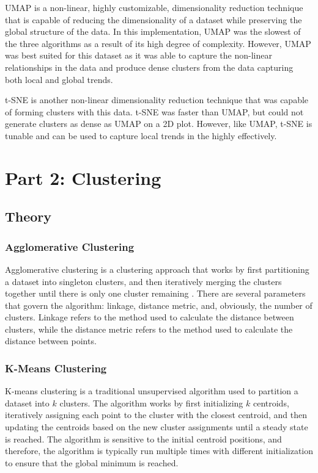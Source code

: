 \documentclass[12pt]{article}
\begin{document}
\begin{enumerate}
    UMAP is a non-linear, highly customizable, dimensionality reduction technique that is capable of reducing the dimensionality of a dataset while preserving the global structure of the data. In this implementation, UMAP was the slowest of the three algorithms as a result of its high degree of complexity. However, UMAP was best suited for this dataset as it was able to capture the non-linear relationships in the data and produce dense clusters from the data capturing both local and global trends.

    t-SNE is another non-linear dimensionality reduction technique that was capable of forming clusters with this data. t-SNE was faster than UMAP, but could not generate clusters as dense as UMAP on a 2D plot. However, like UMAP, t-SNE is tunable and can be used to capture local trends in the  highly effectively.
\end{enumerate}

\section{Part 2: Clustering}
\subsection{Theory}
\subsubsection{Agglomerative Clustering}
Agglomerative clustering is a clustering approach that works by first partitioning a dataset into singleton clusters, and then iteratively merging the clusters together until there is only one cluster remaining \cite{mullner_modern_2011}. There are several parameters that govern the algorithm: linkage, distance metric, and, obviously, the number of clusters. Linkage refers to the method used to calculate the distance between clusters, while the distance metric refers to the method used to calculate the distance between points. 

\subsubsection{K-Means Clustering}
K-means clustering is a traditional unsupervised algorithm used to partition a dataset into $k$ clusters. The algorithm works by first initializing $k$ centroids, iteratively assigning each point to the cluster with the closest centroid, and then updating the centroids based on the new cluster assignments until a steady state is reached. The algorithm is sensitive to the initial centroid positions, and therefore, the algorithm is typically run multiple times with different initialization to ensure that the global minimum is reached.
\end{document}
